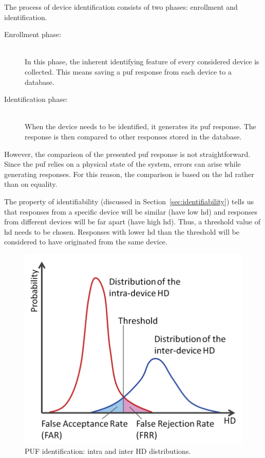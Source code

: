The process of device identification consists of two phases: enrollment and identification\cite{Maes2012}.

\begin{description}
    \item[Enrollment phase:] \hfill \\ In this phase, the inherent identifying feature of every considered device is collected. This means saving a \gls{puf} response from each device to a database.
    \item[Identification phase:] \hfill \\ When the device needs to be identified, it generates its \gls{puf} response. The response is then compared to other responses stored in the database.
\end{description}

However, the comparison of the presented \gls{puf} response is not straightforward. Since the \gls{puf} relies on a physical state of the system, errors can arise while generating responses. For this reason, the comparison is based on the \gls{hd} rather than on equality.

The property of identifiability (discussed in Section~\ref{sec:identifiability}) tells us that responses from a specific device will be similar (have low \gls{hd}) and responses from different devices will be far apart (have high \gls{hd}). Thus, a threshold value of \gls{hd} needs to be chosen. Responses with lower \gls{hd} than the threshold will be considered to have originated from the same device.

\begin{figure}[ht!]
    \centering
    \captionsetup{justification=centering,margin=0.5cm}
    \includegraphics[scale=0.25]{images/identification_histogram.png}
    \caption[PUF identification: intra and inter HD distributions.]{PUF identification: intra and inter HD distributions\cite{Hori2013}.}
    \label{fig:puf_inter_intra_hd}
\end{figure}

